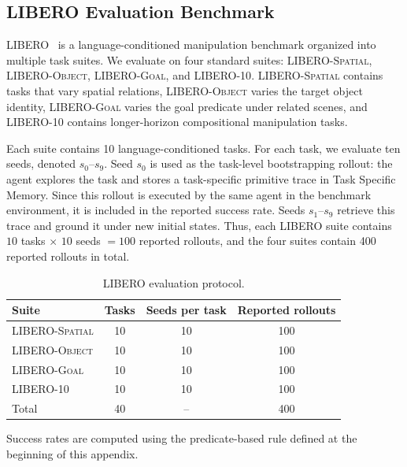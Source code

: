 \documentclass{article}
\begin{document}
\subsection{LIBERO Evaluation Benchmark}
\label{app:benchmark:libero}

LIBERO~\citep{liu2023libero} is a language-conditioned manipulation benchmark organized into multiple task suites. We evaluate on four standard suites: \textsc{LIBERO-Spatial}, \textsc{LIBERO-Object}, \textsc{LIBERO-Goal}, and \textsc{LIBERO-10}. \textsc{LIBERO-Spatial} contains tasks that vary spatial relations, \textsc{LIBERO-Object} varies the target object identity, \textsc{LIBERO-Goal} varies the goal predicate under related scenes, and \textsc{LIBERO-10} contains longer-horizon compositional manipulation tasks.

Each suite contains 10 language-conditioned tasks. For each task, we evaluate ten seeds, denoted $s_0$--$s_9$. Seed $s_0$ is used as the task-level bootstrapping rollout: the agent explores the task and stores a task-specific primitive trace in Task Specific Memory. Since this rollout is executed by the same agent in the benchmark environment, it is included in the reported success rate. Seeds $s_1$--$s_9$ retrieve this trace and ground it under new initial states. Thus, each LIBERO suite contains $10$ tasks $\times$ $10$ seeds $=100$ reported rollouts, and the four suites contain 400 reported rollouts in total.

\begin{table}[h]
    \centering
    \caption{LIBERO evaluation protocol.}
    \label{tab:app_libero_protocol}
    \begin{tabular}{lccc}
        \toprule
        Suite & Tasks & Seeds per task & Reported rollouts \\
        \midrule
        \textsc{LIBERO-Spatial} & 10 & 10 & 100 \\
        \textsc{LIBERO-Object}  & 10 & 10 & 100 \\
        \textsc{LIBERO-Goal}    & 10 & 10 & 100 \\
        \textsc{LIBERO-10}      & 10 & 10 & 100 \\
        \midrule
        Total & 40 & -- & 400 \\
        \bottomrule
    \end{tabular}
\end{table}

Success rates are computed using the predicate-based rule defined at the beginning of this appendix.
\end{document}
